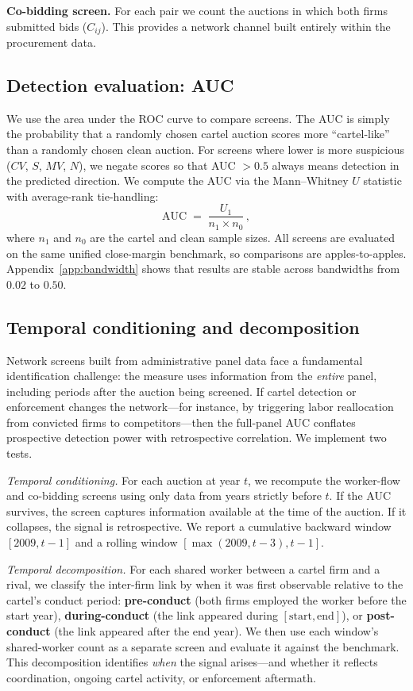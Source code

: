 \noindent\textbf{Co-bidding screen.} For each pair we count the auctions in which both firms submitted bids ($C_{ij}$). This provides a network channel built entirely within the procurement data.

\subsection{Detection evaluation: AUC}\label{sec:auc}

We use the area under the ROC curve to compare screens. The AUC is simply the probability that a randomly chosen cartel auction scores more ``cartel-like'' than a randomly chosen clean auction. For screens where lower is more suspicious ($CV$, $S$, $MV$, $N$), we negate scores so that AUC $> 0.5$ always means detection in the predicted direction. We compute the AUC via the Mann--Whitney $U$ statistic with average-rank tie-handling:
\[
\text{AUC} \;=\; \frac{U_1}{n_1 \times n_0}\,,
\]
where $n_1$ and $n_0$ are the cartel and clean sample sizes. All screens are evaluated on the same unified close-margin benchmark, so comparisons are apples-to-apples. Appendix~\ref{app:bandwidth} shows that results are stable across bandwidths from $0.02$ to $0.50$.

\subsection{Temporal conditioning and decomposition}\label{sec:temporal_method}

Network screens built from administrative panel data face a fundamental identification challenge: the measure uses information from the \emph{entire} panel, including periods after the auction being screened. If cartel detection or enforcement changes the network---for instance, by triggering labor reallocation from convicted firms to competitors---then the full-panel AUC conflates prospective detection power with retrospective correlation. We implement two tests.

\emph{Temporal conditioning.} For each auction at year $t$, we recompute the worker-flow and co-bidding screens using only data from years strictly before $t$. If the AUC survives, the screen captures information available at the time of the auction. If it collapses, the signal is retrospective. We report a cumulative backward window $[2009, t-1]$ and a rolling window $[\max(2009, t-3), t-1]$.

\emph{Temporal decomposition.} For each shared worker between a cartel firm and a rival, we classify the inter-firm link by when it was first observable relative to the cartel's conduct period: \textbf{pre-conduct} (both firms employed the worker before the start year), \textbf{during-conduct} (the link appeared during $[\text{start}, \text{end}]$), or \textbf{post-conduct} (the link appeared after the end year). We then use each window's shared-worker count as a separate screen and evaluate it against the benchmark. This decomposition identifies \emph{when} the signal arises---and whether it reflects coordination, ongoing cartel activity, or enforcement aftermath.

